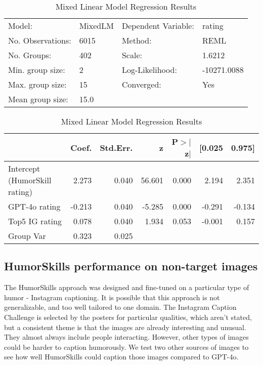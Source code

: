\begin{table}
\caption{Mixed Linear Model Regression Results}
\label{glmm_1}
\begin{center}
\begin{tabular}{llll}
\hline
Model:            & MixedLM & Dependent Variable: & rating       \\
No. Observations: & 6015    & Method:             & REML         \\
No. Groups:       & 402     & Scale:              & 1.6212       \\
Min. group size:  & 2       & Log-Likelihood:     & -10271.0088  \\
Max. group size:  & 15      & Converged:          & Yes          \\
Mean group size:  & 15.0    &                     &              \\
\hline
\end{tabular}
\end{center}

\begin{center}
\begin{tabular}{lrrrrrr}
\hline
                        &  Coef. & Std.Err. &      z & P$> |$z$|$ & [0.025 & 0.975]  \\
\hline
Intercept (HumorSkill rating)             &  2.273 &    0.040 & 56.601 &       0.000 &  2.194 &  2.351  \\
GPT-4o rating & -0.213 &    0.040 & -5.285 &       0.000 & -0.291 & -0.134  \\
Top5 IG rating &  0.078 &    0.040 &  1.934 &       0.053 & -0.001 &  0.157  \\
Group Var               &  0.323 &    0.025 &        &             &        &         \\
\hline
\end{tabular}
\end{center}
\end{table}


\subsection{HumorSkills performance on non-target images}
The HumorSkills approach was designed and fine-tuned on a particular type of humor - Instagram captioning. It is possible that this approach is not generalizable, and too well tailored to one domain. The Instagram Caption Challenge is selected by the posters for particular qualities, which aren't stated, but a consistent theme is that the images are already interesting and unusual.  They almost always include people interacting. However, other types of images could be harder to caption humorously. We test two other sources of images to see how well HumorSkills could caption those images compared to GPT-4o.

